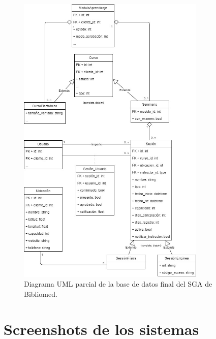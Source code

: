 \begin{figure}[t]
	\begin{center}
		\includegraphics[width=0.8\textwidth]{figuras/databaseBibliomed.jpg}
		\caption{Diagrama UML parcial de la base de datos final del SGA de Bibliomed.} \label{fig:baseDeDatosBibliomed}
	\end{center}
\end{figure}


\chapter{Screenshots de los sistemas}


